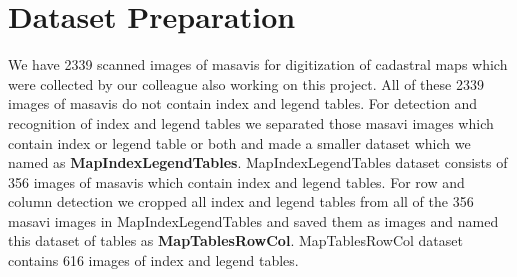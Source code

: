 \section{Dataset Preparation}
\label{datasetPrep}
We have 2339 scanned images of masavis for digitization of cadastral maps which were collected by our colleague also working on this project. All of these 2339 images of masavis do not contain index and legend tables. For detection and recognition of index and legend tables we separated those masavi images which contain index or legend table or both and made a smaller dataset which we named as \textbf{MapIndexLegendTables}. MapIndexLegendTables dataset consists of 356 images of masavis which contain index and legend tables.\newline
For row and column detection we cropped all index and legend tables from all of the 356 masavi images in MapIndexLegendTables and saved them as images and named this dataset of tables as \textbf{MapTablesRowCol}. MapTablesRowCol dataset contains 616 images of index and legend tables.
\begin{table}[h!]
\caption{Dataset Split for Table Detection}
\label{tbl:trainTestImgCount_tableDet}
\centering
{}
\end{table}
\begin{table}[h!]
\caption{Dataset Split for Row and Column Detection}
\label{tbl:trainTestImgCount_rowColDet}
\centering
{}
\end{table}
